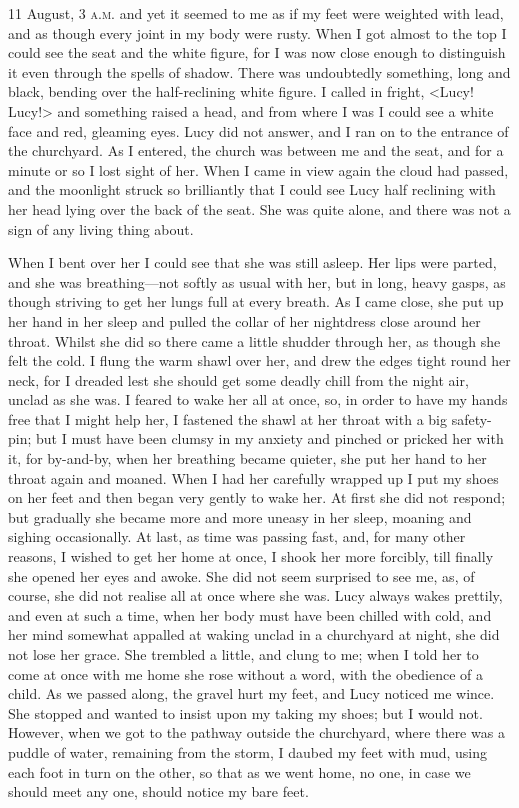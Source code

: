 \begin{diary}{11 August, 3 \textsc{a.m.}}
and yet it seemed to me as if my feet were weighted with lead, and as though every joint in my body were rusty. When I got almost to the top I could see the seat and the white figure, for I was now close enough to distinguish it even through the spells of shadow. There was undoubtedly something, long and black, bending over the half-reclining white figure. I called in fright, <Lucy! Lucy!> and something raised a head, and from where I was I could see a white face and red, gleaming eyes. Lucy did not answer, and I ran on to the entrance of the churchyard. As I entered, the church was between me and the seat, and for a minute or so I lost sight of her. When I came in view again the cloud had passed, and the moonlight struck so brilliantly that I could see Lucy half reclining with her head lying over the back of the seat. She was quite alone, and there was not a sign of any living thing about.

When I bent over her I could see that she was still asleep. Her lips were parted, and she was breathing—not softly as usual with her, but in long, heavy gasps, as though striving to get her lungs full at every breath. As I came close, she put up her hand in her sleep and pulled the collar of her nightdress close around her throat. Whilst she did so there came a little shudder through her, as though she felt the cold. I flung the warm shawl over her, and drew the edges tight round her neck, for I dreaded lest she should get some deadly chill from the night air, unclad as she was. I feared to wake her all at once, so, in order to have my hands free that I might help her, I fastened the shawl at her throat with a big safety-pin; but I must have been clumsy in my anxiety and pinched or pricked her with it, for by-and-by, when her breathing became quieter, she put her hand to her throat again and moaned. When I had her carefully wrapped up I put my shoes on her feet and then began very gently to wake her. At first she did not respond; but gradually she became more and more uneasy in her sleep, moaning and sighing occasionally. At last, as time was passing fast, and, for many other reasons, I wished to get her home at once, I shook her more forcibly, till finally she opened her eyes and awoke. She did not seem surprised to see me, as, of course, she did not realise all at once where she was. Lucy always wakes prettily, and even at such a time, when her body must have been chilled with cold, and her mind somewhat appalled at waking unclad in a churchyard at night, she did not lose her grace. She trembled a little, and clung to me; when I told her to come at once with me home she rose without a word, with the obedience of a child. As we passed along, the gravel hurt my feet, and Lucy noticed me wince. She stopped and wanted to insist upon my taking my shoes; but I would not. However, when we got to the pathway outside the churchyard, where there was a puddle of water, remaining from the storm, I daubed my feet with mud, using each foot in turn on the other, so that as we went home, no one, in case we should meet any one, should notice my bare feet.


\end{diary}
